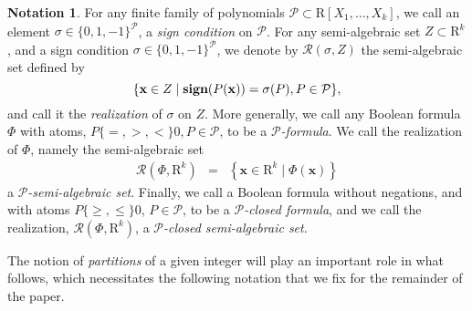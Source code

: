 \documentclass{amsart}
\theoremstyle{definition}
\newtheorem{notation}{Notation}
\theoremstyle{remark}
\numberwithin{equation}{section}
\begin{document}
\begin{notation}
  \label{not:sign-condition} For any finite family of polynomials $\mathcal{P}
  \subset {\mathrm{R}} [ X_{1} , \ldots ,X_{k} ]$, we call an element $\sigma \in \{
  0,1,-1 \}^{\mathcal{P}}$, a \emph{sign condition} on $\mathcal{P}$. For
  any semi-algebraic set $Z \subset {\mathrm{R}}^{k}$, and a sign condition $\sigma \in
  \{ 0,1,-1 \}^{\mathcal{P}}$, we denote by ${{\mathcal R}} (\sigma ,Z)$ the
  semi-algebraic set defined by $$\{ \mathbf{x} \in Z \mid {\mbox{\bf sign}} (P (
  \mathbf{x})) = \sigma (P)  ,P \in \mathcal{P} \},$$ and call it the
  \emph{realization} of $\sigma$ on $Z$. More generally, we call any
  Boolean formula $\Phi$ with atoms, $P \{ =,>,< \} 0, P \in \mathcal{P}$, to
  be a \emph{$\mathcal{P}$-formula}. We call the realization of $\Phi$,
  namely the semi-algebraic set
  \begin{eqnarray*}
    {{\mathcal R}} \left(\Phi , {\mathrm{R}}^{k} \right) & = & \left\{ \mathbf{x} \in {\mathrm{R}}^{k} \mid
    \Phi (\mathbf{x}) \right\}
  \end{eqnarray*}
  a \emph{$\mathcal{P}$-semi-algebraic set}. Finally, we call a Boolean
  formula without negations, and with atoms $P \{\geq, \leq \} 0$, $P\in \mathcal{P}$, to be a 
  \emph{$\mathcal{P}$-closed formula}, and we call
  the realization, ${{\mathcal R}} \left(\Phi , {\mathrm{R}}^{k} \right)$, a \emph{$\mathcal{P}$-closed
  semi-algebraic set}.
\end{notation}

The notion of \emph{partitions} of a given integer will play an important role in what follows,
which necessitates the following notation that we fix for the remainder of the paper.
\end{document}
